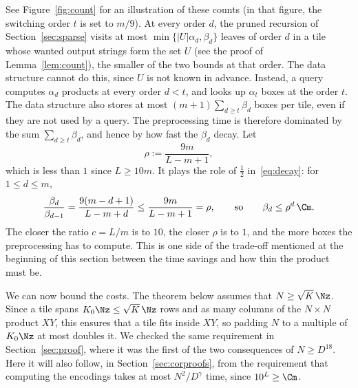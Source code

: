 See Figure~\ref{fig:count} for an illustration of these counts (in that figure, the switching order $t$ is set to $m/9$). At every order $d$, the pruned recursion of Section~\ref{sec:sparse} visits at most $\min\{|U|\alpha_d,\beta_d\}$ leaves of order $d$ in a tile whose wanted output strings form the set $U$ (see the proof of Lemma~\ref{lem:count}), the smaller of the two bounds at that order. The data structure cannot do this, since $U$ is not known in advance. Instead, a query computes $\alpha_d$ products at every order $d<t$, and looks up $\alpha_t$ boxes at the order $t$. The data structure also stores at most $(m+1)\sum_{d\ge t}\beta_d$ boxes per tile, even if they are not used by a query. The preprocessing time is therefore dominated by the sum $\sum_{d\ge t}\beta_d$, and hence by how fast the $\beta_d$ decay. Let
\[
\rho:=\frac{9m}{L-m+1},
\]
which is less than $1$ since $L\ge10m$. It plays the role of $\frac12$ in~\eqref{eq:decay}: for $1\le d\le m$,
\begin{equation}\label{eq:gendecay}
\frac{\beta_d}{\beta_{d-1}}=\frac{9(m-d+1)}{L-m+d}\le\frac{9m}{L-m+1}=\rho,\qquad\text{so}\qquad\beta_d\le\rho^d\,\Cm .
\end{equation}
The closer the ratio $c=L/m$ is to $10$, the closer $\rho$ is to $1$, and the more boxes the preprocessing has to compute. This is one side of the trade-off mentioned at the beginning of this section between the time savings and how thin the product must be.

We can now bound the costs. The theorem below assumes that $N\ge\sqrt K\,\Nz$. Since a tile spans $K_0\Nz\le\sqrt K\,\Nz$ rows and as many columns of the $N\times N$ product $XY$, this ensures that a tile fits inside $XY$, so padding $N$ to a multiple of $K_0\Nz$ at most doubles it. We checked the same requirement in Section~\ref{sec:proof}, where it was the first of the two consequences of $N\ge D^{18}$. Here it will also follow, in Section~\ref{sec:corproofs}, from the requirement that computing the encodings takes at most $N^2/D^{\gamma}$ time, since $10^L\ge\Cm$.

